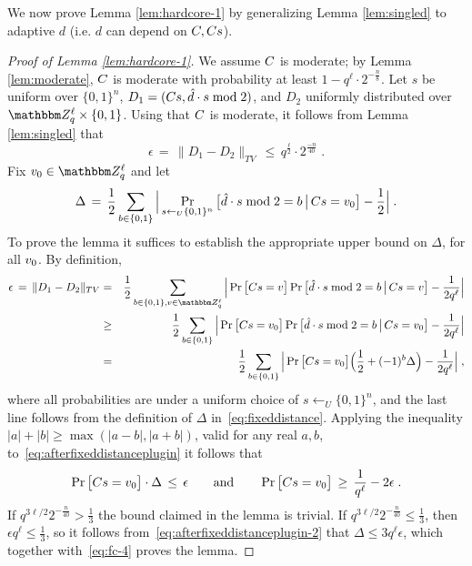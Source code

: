 We now prove Lemma \ref{lem:hardcore-1} by generalizing Lemma \ref{lem:singled} to adaptive $d$ (i.e. $d$ can  depend on $\*C, \*C\*s$).

\begin{proof}[Proof of Lemma \ref{lem:hardcore-1}]
We assume $\*C$ is moderate; by Lemma \ref{lem:moderate}, $\*C$ is moderate with probability at least $1-q^\ell\cdot 2^{-\frac{n}{8}}$. Let $s$ be uniform over $\{0,1\}^n$, $D_1 = (\*C\*s,\hat{d}\cdot s \bmod 2)$, and $D_2$ uniformly distributed over $\mZ_q^{\ell}\times \{0,1\}$. Using that $\*C$ is moderate, it follows from Lemma \ref{lem:singled} that 
\begin{equation}\label{eq:fc-4}
\epsilon\,=\,\|D_1-D_2\|_{TV} \,\leq\, q^{\frac{\ell}{2}}\cdot 2^{\frac{-n}{40}}\;.
\end{equation}
 Fix $\*v_0 \in \mZ_q^\ell$ and let 
\begin{eqnarray}\label{eq:fixeddistance}
\Delta \,=\, \frac{1}{2}\sum_{b\in \{0,1\}}\Big|\Pr_{s \leftarrow_U \{0,1\}^n}\big[\hat{d}\cdot s \bmod 2 = b \,\big| \, \*C\*s = \*v_0\big] - \frac{1}{2}\Big|\;.
\end{eqnarray}
To prove the lemma it suffices to establish the appropriate upper bound on $\Delta$, for all $\*v_0$. By definition, 
\begin{eqnarray}
\epsilon\,=\,\|D_1-D_2\|_{TV} &=& \frac{1}{2}\sum_{b\in \{0,1\}, v\in \mZ_q^{\ell}}\Big|\Pr\big[\*C\*s = \*v\big] \Pr\big[\hat{d}\cdot s \bmod 2 = b \,\big|\, \*C\*s = \*v\big] - \frac{1}{2q^\ell} \Big|\notag\\
&\geq& \frac{1}{2}\sum_{b\in \{0,1\}}\Big|\Pr\big[\*C\*s = \*v_0\big] \Pr\big[\hat{d}\cdot s \bmod 2 = b \,\big|\, \*C\*s = \*v_0\big] - \frac{1}{2q^\ell} \Big|\notag\\
&=& \frac{1}{2}\sum_{b\in \{0,1\}}\Big|\Pr\big[\*C\*s = \*v_0\big] \Big(\frac{1}{2} + (-1)^b\Delta\Big) - \frac{1}{2q^\ell} \Big|\;,\label{eq:afterfixeddistanceplugin}
\end{eqnarray}
where all probabilities are under a uniform choice of $s\leftarrow_U \{0,1\}^n$, and the last line follows from the definition of $\Delta$ in~\eqref{eq:fixeddistance}. Applying the inequality $|a|+|b| \geq \max(|a-b|,|a+b|)$, valid for any real $a,b$, to~\eqref{eq:afterfixeddistanceplugin} it follows that 
\begin{equation}
\Pr\big[\*C\*s = \*v_0\big]\cdot \Delta \,\leq\, \epsilon\qquad \text{and} \qquad 
\Pr\big[\*C\*s = \*v_0\big] \,\geq \,\frac{1}{q^\ell} - 2\epsilon\;.\label{eq:afterfixeddistanceplugin-2}
\end{equation}
If $q^{3\ell/2} 2^{-\frac{n}{40}} > \frac{1}{3}$ the bound claimed in the lemma is trivial. If $q^{3\ell/2} 2^{-\frac{n}{40}} \leq \frac{1}{3}$, then $\epsilon q^\ell \leq \frac{1}{3}$, so it follows from~\eqref{eq:afterfixeddistanceplugin-2} that $\Delta \leq 3q^\ell\epsilon$, which together with~\eqref{eq:fc-4} proves the lemma. 
\end{proof}


